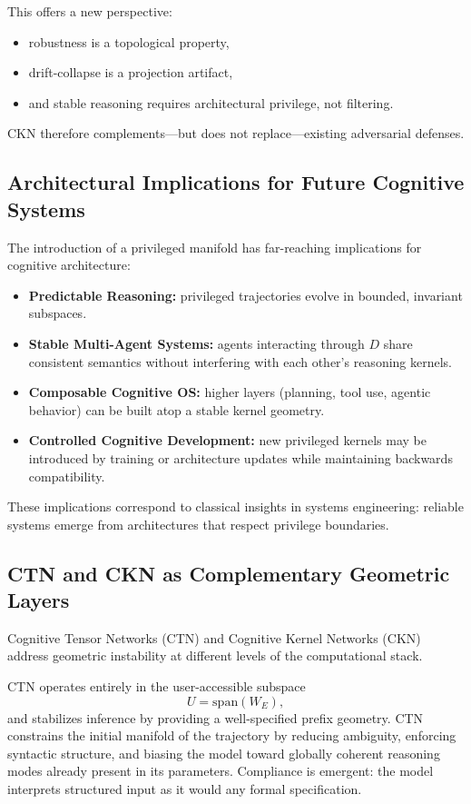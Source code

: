 \documentclass[11pt,a4paper]{article}
\begin{document}
This offers a new perspective:
\begin{itemize}
    \item robustness is a topological property,
    \item drift-collapse is a projection artifact,
    \item and stable reasoning requires architectural privilege, not filtering.
\end{itemize}

CKN therefore complements---but does not replace---existing adversarial defenses.

\subsection{Architectural Implications for Future Cognitive Systems}

The introduction of a privileged manifold has far-reaching implications for cognitive architecture:
\begin{itemize}
    \item \textbf{Predictable Reasoning:} privileged trajectories evolve in bounded, invariant subspaces.
    \item \textbf{Stable Multi-Agent Systems:} agents interacting through $D$ share consistent semantics without interfering with each other's reasoning kernels.
    \item \textbf{Composable Cognitive OS:} higher layers (planning, tool use, agentic behavior) can be built atop a stable kernel geometry.
    \item \textbf{Controlled Cognitive Development:} new privileged kernels may be introduced by training or architecture updates while maintaining backwards compatibility.
\end{itemize}

These implications correspond to classical insights in systems engineering: reliable systems emerge from architectures that respect privilege boundaries.

\subsection{CTN and CKN as Complementary Geometric Layers}

Cognitive Tensor Networks (CTN) and Cognitive Kernel Networks (CKN) address geometric instability at different levels of the computational stack.

CTN operates entirely in the user-accessible subspace
\[
U = \text{span}(W_E),
\]
and stabilizes inference by providing a well-specified prefix geometry. CTN constrains the initial manifold of the trajectory by reducing ambiguity, enforcing syntactic structure, and biasing the model toward globally coherent reasoning modes already present in its parameters. Compliance is emergent: the model interprets structured input as it would any formal specification.
\end{document}
